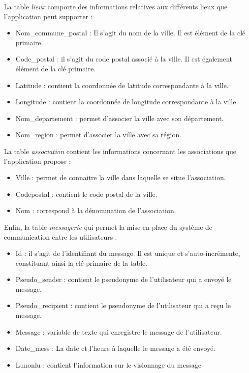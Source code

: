 \documentclass{article}
\begin{document}
La table \textit{lieux} comporte des informations relatives aux différents lieux que l’application peut supporter :

\begin{itemize}
    \item Nom\_commune\_postal : Il s’agit du nom de la ville. Il est élément de la clé primaire.
    \item Code\_postal : il s’agit du code postal associé à la ville. Il est également élément de la clé primaire.
    \item Latitude : contient la coordonnée de latitude correspondante à la ville.
    \item Longitude : contient la coordonnée de longitude correspondante à la ville.
    \item Nom\_departement : permet d’associer la ville avec son département.
    \item Nom\_region : permet d’associer la ville avec sa région.
\end{itemize}
	
La table \textit{association} contient les informations concernant les associations que l’application propose :

\begin{itemize}
    \item Ville : permet de connaitre la ville dans laquelle se situe l’association.
    \item Codepostal : contient le code postal de la ville.
    \item Nom : correspond à la dénomination de l’association.
\end{itemize}

Enfin, la table \textit{messagerie} qui permet la mise en place du système de communication entre les utilisateurs :

\begin{itemize}
    \item Id : il s’agit de l’identifiant du message. Il est unique et s’auto-incrémente, constituant ainsi la clé primaire de la table.
    \item Pseudo\_sender : contient le pseudonyme de l’utilisateur qui a envoyé le message.
    \item Pseudo\_recipient : contient le pseudonyme de l’utilisateur qui a reçu le message.
    \item Message : variable de texte qui enregistre le message de l’utilisateur.
    \item Date\_mess : La date et l’heure à laquelle le message a été envoyé.
    \item Lunonlu : contient l’information sur le visionnage du message 
\end{itemize}
\end{document}
